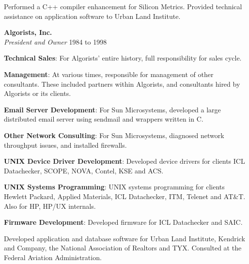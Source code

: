 \documentclass[12pt,margin,line]{res}
\newcommand{\internalskip}{\vspace{-.15in}}
\begin{document}
\begin{resume}
\internalskip
Performed a C++ compiler enhancement for Silicon Metrics.
Provided technical assistance on application software to Urban Land Institute.

{\bf Algorists, Inc.} \\
{\em President and Owner} \hfill 1984 to 1998

\internalskip
{\footnotesize\bf Technical Sales}:
For Algorists' entire history, full responsibility for sales cycle.

\internalskip
{\footnotesize\bf Management}:
At various times, responsible for management of other consultants.
These included partners within Algorists, and consultants hired by Algorists
or its clients.

\internalskip
{\footnotesize\bf Email Server Development}:
For Sun Microsystems, developed a large distributed email server using
 sendmail and wrappers written in C.

\internalskip
{\footnotesize\bf Other Network Consulting}:
For Sun Microsystems, diagnosed network throughput issues, and installed
firewalls.

\internalskip
{\footnotesize\bf UNIX Device Driver Development}:
Developed device drivers for clients ICL Datachecker, SCOPE, NOVA, Contel,
KSE and ACS.

\internalskip
{\footnotesize\bf UNIX Systems Programming}:
UNIX systems programming for clients Hewlett Packard, Applied Materials,
ICL Datachecker, ITM, Telenet and AT\&T.
Also for HP, HP/UX internals.

\internalskip
{\footnotesize\bf Firmware Development}:
Developed firmware for ICL Datachecker and SAIC.

\internalskip
Developed application and database software for Urban Land Institute, Kendrick
and Company, the National Association of Realtors and TYX.
Consulted at the Federal Aviation Administration.

\end{resume}
\end{document}

